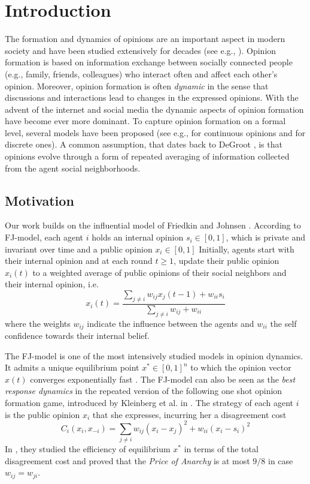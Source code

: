 \section{Introduction}
The formation and dynamics of opinions are an important aspect in modern 
society and have been studied extensively for decades (see e.g., \cite{Jackson}).
Opinion formation is based on information exchange between socially 
connected people (e.g., family, friends, colleagues) who interact often 
and affect each other's opinion. Moreover, opinion
formation is often \emph{dynamic} in the sense that discussions and 
interactions lead to changes in the expressed opinions. With the 
advent of the internet and social media the dynamic aspects of 
opinion formation have become ever more dominant. To capture opinion formation 
on a formal level, several models have been proposed 
(see e.g., \cite{DeGroot,FJ90,HK,BKO11,GS14,BGM13} for 
continuous opinions and \cite{FGV12,YOASS13,BFM16} for discrete ones). 
A common assumption, that dates back to DeGroot \cite{DeGroot}, is 
that opinions evolve through a form of repeated averaging of 
information collected from the agent social neighborhoods.

\subsection{Motivation}
Our work builds on the influential model of Friedkin and
Johnsen \cite{FJ90}. According to FJ-model, each agent $i$ holds an 
internal opinion $s_i\in [0,1]$, which is private and
invariant over time and a public opinion $x_i \in [0,1]$
Initially, agents start with their internal opinion and at 
each round $t\geq1$, update their public opinion
$x_i(t)$ to a weighted average of public opinions of 
their social neighbors and their internal opinion, i.e.
\[x_i(t)= \frac{\sum_{j\neq i}w_{ij}x_j(t-1) + w_{ii}s_i}{\sum_{j\neq i}w_{ij}+w_{ii}}\]
where the weights $w_{ij}$ indicate the influence between
the agents and $w_{ii}$ the self confidence towards their 
internal belief. 

The FJ-model is one of the most intensively studied models
in opinion dynamics. It admits a 
unique equilibrium point $x^* \in [0,1]^n$ to which
the opinion vector $x(t)$ converges exponentially fast
\cite{GS14}. The FJ-model can also be seen as the \emph{best response
dynamics} in the repeated version of the following one shot
opinion formation game, introduced by Kleinberg et al. in \cite{BKO11}. 
The strategy of each agent $i$ is the public opinion $x_i$ that she expresses,
incurring her a disagreement cost \[C_i(x_i,x_{-i})=\sum_{j \neq i}w_{ij}(x_i-x_j)^2 + w_{ii}(x_i-s_i)^2\]
In \cite{BKO11}, they studied the efficiency of equilibrium $x^*$ in terms
of the total disagreement cost and proved that the 
\emph{Price of Anarchy} is at most $9/8$ in case $w_{ij}=w_{ji}$.

